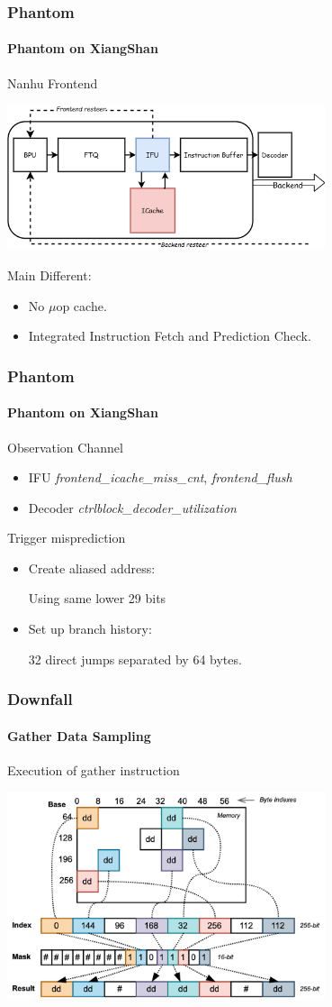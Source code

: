 \documentclass{beamer}
\begin{document}
\begin{frame}
    \frametitle{Phantom}
    \framesubtitle{Phantom on XiangShan}
    Nanhu Frontend
    \begin{center}
        \includegraphics[width=0.7\textwidth]{Figure/xs-frontend.png}
    \end{center}
    Main Different:
    \begin{itemize}
        \item No $\mu$op cache.
        \item Integrated Instruction Fetch and Prediction Check.
    \end{itemize}
\end{frame}

\begin{frame}
    \frametitle{Phantom}
    \framesubtitle{Phantom on XiangShan}
    Observation Channel
    \begin{itemize}
        \item IFU
        \textit{frontend\_icache\_miss\_cnt}, \textit{frontend\_flush}
        \item Decoder
        \textit{ctrlblock\_decoder\_utilization}
    \end{itemize}
    Trigger misprediction
    \begin{itemize}
        \item Create aliased address:

            Using same lower 29 bits
        \item Set up branch history:
            
           32 direct jumps separated by 64 bytes.
    \end{itemize}
    
\end{frame}


\begin{frame}
    \frametitle{Downfall}
    \framesubtitle{Gather Data Sampling}
    Execution of gather instruction\cite{downfall}
    \begin{center}
        \includegraphics[width=0.7\textwidth]{Figure/gather.png}
    \end{center}
\end{frame}
\end{document}
